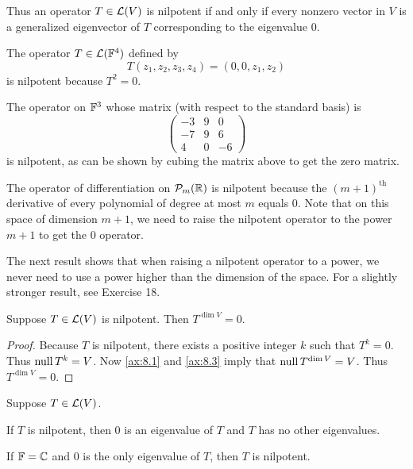 Thus an operator $T\in\mathcal{L}(V)$ is nilpotent if and only if every nonzero vector
in $V$ is a generalized eigenvector of $T$ corresponding to the eigenvalue $0$.

\begin{example}\label{ax:8.15}\leavevmode
\begin{parts}
\item The operator $T\in\mathcal{L}(\mathbb{F}^4)$ defined by
  \[ T(z_1,z_2,z_3,z_4) = (0,0,z_1,z_2) \]
  is nilpotent because $T^2=0$.
\item The operator on $\mathbb{F}^3$ whose matrix (with respect to the standard basis)
  is
  \[ \begin{pmatrix} -3 & 9 & 0\\ -7 & 9 & 6\\ 4 & 0 & -6 \end{pmatrix} \]
  is nilpotent, as can be shown by cubing the matrix above to get the zero
  matrix.
\item The operator of differentiation on $\mathcal{P}_m(\mathbb{R})$ is nilpotent because the
  $(m+1)^{\text{th}}$ derivative of every polynomial of degree at most $m$
  equals $0$. Note that on this space of dimension $m+1$, we need to raise the
  nilpotent operator to the power $m+1$ to get the $0$ operator.
\end{parts}
\end{example}

%
The next result shows that when raising a nilpotent operator to a power, we
never need to use a power higher than the dimension of the space. For a
slightly stronger result, see Exercise 18.

\begin{result}\label{ax:8.16}
Suppose $T\in\mathcal{L}(V)$ is nilpotent. Then $T^{\dim V}=0$.
\end{result}

\begin{proof}
Because $T$ is nilpotent, there exists a positive integer $k$ such that
$T^k=0$. Thus $\operatorname{null} T^k=V$. Now \ref{ax:8.1} and \ref{ax:8.3} imply that
$\operatorname{null} T^{\operatorname{dim} V}=V$. Thus $T^{\dim V}=0$.
\end{proof}

\begin{result}\label{ax:8.17}
Suppose $T\in\mathcal{L}(V)$.
\begin{parts}
\item If $T$ is nilpotent, then $0$ is an eigenvalue of $T$ and $T$ has no
  other eigenvalues.
\item If $\mathbb{F}=\mathbb{C}$ and $0$ is the only eigenvalue of $T$, then $T$ is nilpotent.
\end{parts}
\end{result}

